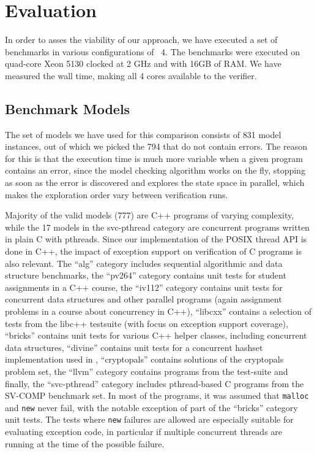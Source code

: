 \section{Evaluation}\label{sec:lang:evaluation}

In order to asses the viability of our approach, we have executed a set
of benchmarks in various configurations of \divine{}~4. The benchmarks were
executed on quad-core Xeon 5130 clocked at 2 GHz and with 16GB of RAM.
We have measured the wall time, making all 4 cores available to the
verifier.

\subsection{Benchmark Models}\label{benchmark-models}

The set of models we have used for this comparison consists of 831 model
instances, out of which we picked the 794 that do not contain errors.
The reason for this is that the execution time is much more variable
when a given program contains an error, since the model checking
algorithm works on the fly, stopping as soon as the error is discovered and
explores the state space in parallel, which makes the exploration order vary
between verification runs.

Majority of the valid models (777) are C++ programs of varying
complexity, while the 17 models in the svc-pthread category are
concurrent programs written in plain C with pthreads. Since our
implementation of the POSIX thread API is done in C++, the impact of
exception support on verification of C programs is also relevant. The
``alg'' category includes sequential algorithmic and data structure
benchmarks, the ``pv264'' category contains unit tests for student
assignments in a C++ course, the ``iv112'' category contains unit tests
for concurrent data structures and other parallel programs (again assignment
problems in a course about concurrency in C++), ``libcxx'' contains a selection
of tests from
the libc++ testsuite (with focus on exception support
coverage), ``bricks'' contains unit tests for various C++ helper
classes, including concurrent data structures, ``divine'' contains unit
tests for a concurrent hashset implementation used in \divine{},
``cryptopals'' contains solutions of the cryptopals problem
set, the ``llvm'' category
contains programs from the \llvm{} test-suite
and finally, the ``svc-pthread'' category includes pthread-based C
programs from the SV-COMP benchmark set. In most of the programs, it was
assumed that \texttt{malloc} and \texttt{new} never fail, with the
notable exception of part of the ``bricks'' category unit tests. The
tests where \texttt{new} failures are allowed are especially suitable
for evaluating exception code, in particular if multiple concurrent
threads are running at the time of the possible failure.

